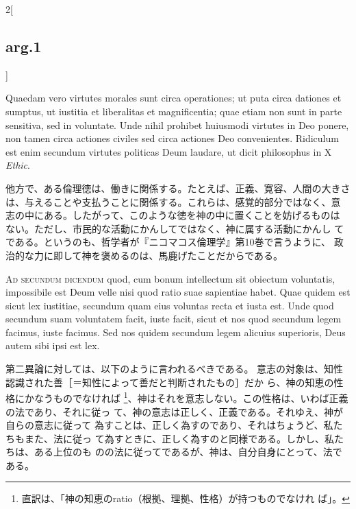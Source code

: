 \documentclass[paper=a4paper,fontsize=10pt,jafontsize=9pt,titlepage]{jlreq}
\begin{document}
\begin{paracol}{2}[\subsection{arg.1}]
\switchcolumn*

Quaedam vero virtutes morales sunt
circa operationes; ut puta circa dationes et sumptus, ut iustitia et
liberalitas et magnificentia; quae etiam non sunt in parte sensitiva,
sed in voluntate. Unde nihil prohibet huiusmodi virtutes in Deo ponere,
non tamen circa actiones civiles sed circa actiones Deo
convenientes. Ridiculum est enim secundum virtutes politicas Deum
laudare, ut dicit philosophus in X {\itshape Ethic}.

\switchcolumn

他方で、ある倫理徳は、働きに関係する。たとえば、正義、寛容、人間の大きさ
 は、与えることや支払うことに関係する。これらは、感覚的部分ではなく、意
 志の中にある。したがって、このような徳を神の中に置くことを妨げるものは
 ない。ただし、市民的な活動にかんしてではなく、神に属する活動にかんし
 てである。というのも、哲学者が『ニコマコス倫理学』第10巻で言うように、
 政治的な力に即して神を褒めるのは、馬鹿げたことだからである。

\switchcolumn*[\subsection{ad.2}]

{\scshape Ad secundum dicendum} quod, cum bonum
intellectum sit obiectum voluntatis, impossibile est Deum velle nisi
quod ratio suae sapientiae habet. Quae quidem est sicut lex iustitiae,
secundum quam eius voluntas recta et iusta est. Unde quod secundum suam
voluntatem facit, iuste facit, sicut et nos quod secundum legem facimus,
iuste facimus. Sed nos quidem secundum legem alicuius superioris, Deus
autem sibi ipsi est lex.

\switchcolumn

第二異論に対しては、以下のように言われるべきである。
意志の対象は、知性認識された善［＝知性によって善だと判断されたもの］だか
 ら、神の知恵の性格にかなうものでなければ
 \footnote{直訳は、「神の知恵のratio（根拠、理拠、性格）が持つものでなけれ
 ば」。}、神はそれを意志しない。この性格は、いわば正義の法であり、それに従っ
 て、神の意志は正しく、正義である。それゆえ、神が自らの意志に従って
 為すことは、正しく為すのであり、それはちょうど、私たちもまた、法に従っ
 て為すときに、正しく為すのと同様である。しかし、私たちは、ある上位のも
 のの法に従ってであるが、神は、自分自身にとって、法である。

\switchcolumn*[\subsection{ad.3}]


\end{paracol}
\end{document}
